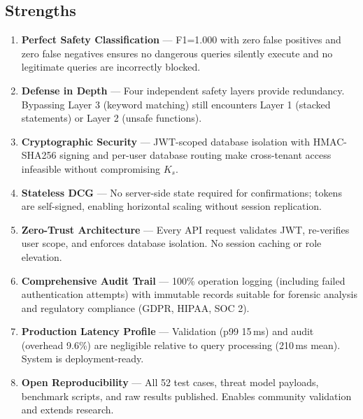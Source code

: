 \documentclass[conference]{IEEEtran}
\begin{document}
\subsection{Strengths}
\begin{enumerate}
  \item \textbf{Perfect Safety Classification} --- F1=1.000 with zero false positives and zero false negatives ensures no dangerous queries silently execute and no legitimate queries are incorrectly blocked.
  
  \item \textbf{Defense in Depth} --- Four independent safety layers provide redundancy. Bypassing Layer 3 (keyword matching) still encounters Layer 1 (stacked statements) or Layer 2 (unsafe functions).
  
  \item \textbf{Cryptographic Security} --- JWT-scoped database isolation with HMAC-SHA256 signing and per-user database routing make cross-tenant access infeasible without compromising $K_s$.
  
  \item \textbf{Stateless DCG} --- No server-side state required for confirmations; tokens are self-signed, enabling horizontal scaling without session replication.
  
  \item \textbf{Zero-Trust Architecture} --- Every API request validates JWT, re-verifies user scope, and enforces database isolation. No session caching or role elevation.
  
  \item \textbf{Comprehensive Audit Trail} --- 100\% operation logging (including failed authentication attempts) with immutable records suitable for forensic analysis and regulatory compliance (GDPR, HIPAA, SOC 2).
  
  \item \textbf{Production Latency Profile} --- Validation (p99 15\,ms) and audit (overhead 9.6\%) are negligible relative to query processing (210\,ms mean). System is deployment-ready.
  
  \item \textbf{Open Reproducibility} --- All 52 test cases, threat model payloads, benchmark scripts, and raw results published. Enables community validation and extends research.
\end{enumerate}
\end{document}
